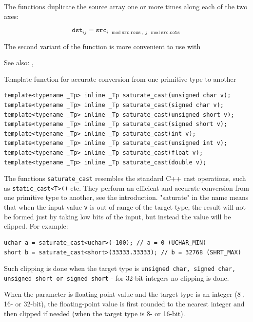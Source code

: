 The functions  duplicate the source array one or more times along each of the two axes:

\[\texttt{dst}_{ij}=\texttt{src}_{i\mod\texttt{src.rows},\;j\mod\texttt{src.cols}}\]

The second variant of the function is more convenient to use with 

See also: , 

\label{saturatecast}
Template function for accurate conversion from one primitive type to another

\begin{lstlisting}
template<typename _Tp> inline _Tp saturate_cast(unsigned char v);
template<typename _Tp> inline _Tp saturate_cast(signed char v);
template<typename _Tp> inline _Tp saturate_cast(unsigned short v);
template<typename _Tp> inline _Tp saturate_cast(signed short v);
template<typename _Tp> inline _Tp saturate_cast(int v);
template<typename _Tp> inline _Tp saturate_cast(unsigned int v);
template<typename _Tp> inline _Tp saturate_cast(float v);
template<typename _Tp> inline _Tp saturate_cast(double v);
\end{lstlisting}
\begin{description}
\end{description}

The functions \texttt{saturate\_cast} resembles the standard C++ cast operations, such as \texttt{static\_cast<T>()} etc. They perform an efficient and accurate conversion from one primitive type to another, see the introduction. "saturate" in the name means that when the input value \texttt{v} is out of range of the target type, the result will not be formed just by taking low bits of the input, but instead the value will be clipped. For example:

\begin{lstlisting}
uchar a = saturate_cast<uchar>(-100); // a = 0 (UCHAR_MIN)
short b = saturate_cast<short>(33333.33333); // b = 32768 (SHRT_MAX)
\end{lstlisting}

Such clipping is done when the target type is \texttt{unsigned char, signed char, unsigned short or signed short} - for 32-bit integers no clipping is done.

When the parameter is floating-point value and the target type is an integer (8-, 16- or 32-bit), the floating-point value is first rounded to the nearest integer and then clipped if needed (when the target type is 8- or 16-bit).

